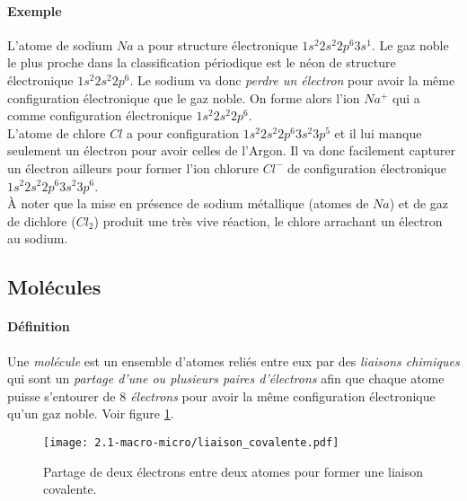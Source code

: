 \paragraph{Exemple} L'atome de sodium $Na$ a pour structure électronique $1s^2 2s^2 2p^{6} 3s^1 $. Le gaz noble le plus
proche dans la classification périodique est le néon de structure électronique $1s^2 2s^2 2p^{6}$. Le sodium va donc \textit{perdre 
un électron} pour avoir la même configuration électronique que le gaz noble. On forme alors l'ion $Na^+$ qui a comme 
configuration électronique $1s^2 2s^2 2p^{6}$.\\
L'atome de chlore $Cl$ a pour configuration $1s^2 2s^2 2p^{6} 3s^2 3p^5$ et il lui manque seulement un électron pour avoir celles de l'Argon.
Il va donc facilement capturer un électron ailleurs pour former l'ion chlorure $Cl^-$ de configuration électronique $1s^2 2s^2 2p^{6} 3s^2 3p^6$.\\
À noter que la mise en présence de sodium métallique (atomes de $Na$) et de gaz de dichlore ($Cl_2$) produit une très vive réaction, le chlore arrachant
un électron au sodium.

\subsection{Molécules}
\paragraph{Définition} Une \textit{molécule} est un ensemble d'atomes reliés entre eux par des \textit{liaisons chimiques}
qui sont un \textit{partage d'une ou plusieurs paires d'électrons} afin que chaque atome puisse s'entourer de \textit{$8$ électrons}
pour avoir la même configuration électronique qu'un gaz noble. Voir figure \ref{fig:liaison-covalente}.
\begin{figure}[!h]
  \begin{center}
      \texttt{[image: 2.1-macro-micro/liaison\_covalente.pdf]}
  \end{center}
  \caption{Partage de deux électrons entre deux atomes pour former une liaison covalente.}
  \label{fig:liaison-covalente}
\end{figure}
